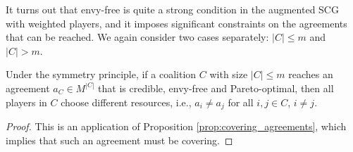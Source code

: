 
It turns out that envy-free is quite a strong condition in the augmented SCG with weighted players, and it imposes significant constraints on the agreements that can be reached. We again consider two cases separately: $|C| \leq m$ and $|C| > m$.

\begin{lemma}
    Under the symmetry principle, if a coalition $C$ with size $|C| \leq m$ reaches an agreement $a_C \in M^{|C|}$ that is credible, envy-free and Pareto-optimal, then all players in $C$ choose different resources, i.e., $a_i \neq a_j$ for all $i, j \in C$, $i \neq j$.
\end{lemma}

\begin{proof}
    This is an application of Proposition \ref{prop:covering_agreements}, which implies that such an agreement must be covering. %
\end{proof}


